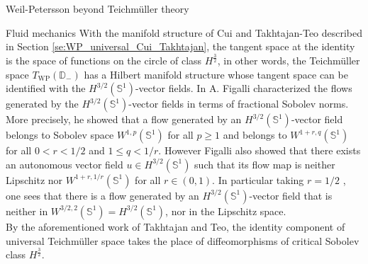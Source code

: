 \documentclass[12pt]{amsart}
\theoremstyle{plain}
\theoremstyle{definition}
\theoremstyle{remark}
\numberwithin{equation}{section} %
\numberwithin{figure}{section} %
\begin{document}
\begin{section}{Weil-Petersson beyond Teichm\"uller theory}
\begin{subsection}{Fluid mechanics}
With the manifold structure of Cui and Takhtajan-Teo described in  Section \ref{se:WP_universal_Cui_Takhtajan}, 
the tangent space at the identity is the space of functions on the circle of class \(H^{\frac{3}{2}}\), in other words, the {Teichm\"uller space \(T_{\mathrm{WP}}(\mathbb{D}_-)\)} has a Hilbert manifold structure whose tangent space can be identified
with the \(H^{3 / 2}\left(\mathbb{S}^{1}\right)\)-vector fields. In \cite{Figalli} A. Figalli characterized the flows generated by the \(H^{3 / 2}\left(\mathbb{S}^{1}\right)\)-vector fields in terms of
fractional Sobolev norms. More precisely, he showed that a flow generated by an \(H^{3 / 2}\left(\mathbb{S}^{1}\right)\)-vector
field belongs to Sobolev space \(W^{1, p}\left(\mathbb{S}^{1}\right)\) for all \(p \geq 1\) and belongs to \(W^{1+r, q}\left(\mathbb{S}^{1}\right)\) for all \(0<r<1 / 2\) and
\(1 \leq q<1 / r\). However Figalli also showed that there exists an autonomous vector field \(u \in H^{3 / 2}\left(\mathbb{S}^{1}\right)\) such that its
flow map is neither Lipschitz nor \(W^{1+r, 1 / r}(\mathbb{S}^{1})\) for all \(r \in(0,1)\). In particular taking $r=1/2$ , one sees that there is a flow generated by an \(H^{3 / 2}\left(\mathbb{S}^{1}\right)\)-vector field that is neither in \(W^{3/2, 2}(\mathbb{S}^{1})=H^{3 / 2}(\mathbb{S}^{1})\), nor in the Lipschitz space.\\

By the aforementioned work of Takhtajan and Teo, the identity component of universal Teichm\"uller space takes the place of
diffeomorphisms of critical Sobolev class \(H^{\frac{3}{2}}\).


\end{subsection}
\end{section}
\end{document}
